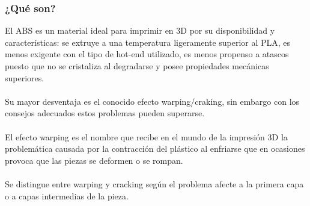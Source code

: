 \documentclass[11pt,a4paper]{article}
\begin{document}
		\subsubsection{¿Qué son?}El ABS es un material ideal para imprimir en 3D por su disponibilidad y características: se extruye a una temperatura ligeramente superior al PLA, es menos exigente con el tipo de hot-end utilizado, es menos propenso a atascos puesto que no se cristaliza al degradarse y posee propiedades mecánicas superiores.
\\\\
Su mayor desventaja es el conocido efecto warping/craking, sin embargo con los consejos adecuados estos problemas pueden superarse.
\\\\
El efecto warping es el nombre que recibe en el mundo de la impresión 3D la problemática causada por la contracción del plástico al enfriarse que en ocasiones provoca que las piezas se deformen o se rompan.
\\\\
Se distingue entre warping y cracking según el problema afecte a la primera capa o a capas intermedias de la pieza.
\end{document}
